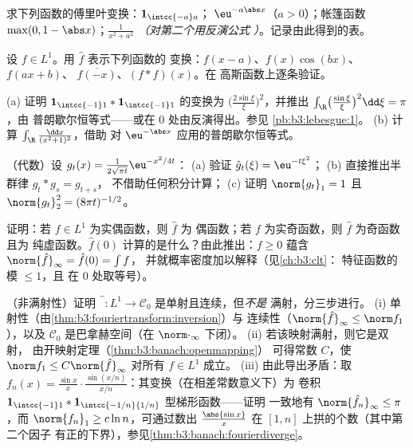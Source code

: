 \begin{exercise}[$\star$]\label{exo:b3:fouriertransform:1}
求下列函数的傅里叶变换：$\mathbf 1_{\intcc{-a}a}$；
$\eu^{-a\abs x}$（$a > 0$）；帐篷函数 $\max(0, 1 -
\abs x)$；$\frac1{x^2 + a^2}$ \emph{（对第二个用反演公式
）}。记录由此得到的表。
\end{exercise}

\begin{exercise}[$\star$]\label{exo:b3:fouriertransform:2}
设 $f \in L^1$。用 $\hat f$ 表示下列函数的
变换：$f(x - a)$、$f(x)\cos(bx)$、$f(ax + b)$、
$\overline{f(-x)}$、$(f * f)(x)$。在
高斯函数上逐条验证。
\end{exercise}

\begin{exercise}[$\star\star$]\label{exo:b3:fouriertransform:3}
(a) 证明 $\mathbf 1_{\intcc{-1}1} * \mathbf
1_{\intcc{-1}1}$ 的变换为 $\bigl(\frac{2\sin\xi}\xi
\bigr)^2$，并推出
$\int_\R\bigl(\frac{\sin\xi}\xi\bigr)^2\dd\xi = \pi$，由
普朗歇尔恒等式——或在 $0$ 处由反演得出。参见
\cref{pb:b3:lebesgue:1}。
(b) 计算 $\int_\R\frac{\dd x}{(x^2+1)^2}$，借助
对 $\eu^{-\abs x}$ 应用的普朗歇尔恒等式。
\end{exercise}

\begin{exercise}[$\star\star$]\label{exo:b3:fouriertransform:4}
（代数）设 $g_t(x) =
\frac1{2\sqrt{\pi t}}\eu^{-x^2/4t}$：
(a) 验证 $\hat g_t(\xi) = \eu^{-t\xi^2}$；
(b) 直接推出半群律 $g_t * g_s = g_{t+s}$，
不借助任何积分计算；
(c) 证明 $\norm{g_t}_1 = 1$ 且 $\norm{g_t}_2^2 =
(8\pi t)^{-1/2}$。
\end{exercise}

\begin{exercise}[$\star\star$]\label{exo:b3:fouriertransform:5}
证明：若 $f \in L^1$ 为实偶函数，则 $\hat f$ 为
偶函数；若 $f$ 为实奇函数，则 $\hat f$ 为奇函数且为
纯虚函数。$\hat f(0)$ 计算的是什么？由此推出：$f \geq
0$ 蕴含 $\norm{\hat f}_\infty = \hat f(0) = \int f$，
并就概率密度加以解释（见\cref{ch:b3:clt}：
特征函数的模 $\leq 1$，且
在 $0$ 处取等号）。
\end{exercise}

\begin{exercise}[$\star\star\star$]\label{exo:b3:fouriertransform:6}
（非满射性）证明 $\widehat{\phantom f}\colon L^1
\to \mathcal C_0$ 是单射且连续，但\emph{不是}
满射，分三步进行。
(i) 单射性（由\cref{thm:b3:fouriertransform:inversion}）与
连续性（$\norm{\hat f}_\infty \leq \norm f_1$），以及
$\mathcal C_0$ 是巴拿赫空间（在
$\norm\cdot_\infty$ 下闭）。
(ii) 若该映射满射，则它是双射，
由开映射定理（\cref{thm:b3:banach:openmapping}）
可得常数 $C$，使 $\norm f_1 \leq C\norm{\hat
f}_\infty$ 对所有 $f \in L^1$ 成立。
(iii) 由此导出矛盾：取 $f_n(x) = \frac{\sin
x}{x}\cdot\frac{\sin(x/n)}{x/n}$：其变换（在相差常数意义下）为
卷积 $\mathbf 1_{\intcc{-1}1} *
\mathbf 1_{\intcc{-1/n}{1/n}}$ 型梯形函数——证明
一致地有 $\norm{\hat f_n}_\infty \leq \pi$，而
$\norm{f_n}_1 \geq c\ln n$，可通过数出
$\frac{\abs{\sin x}}x$ 在 $[1, n]$ 上拱的个数（其中第二个因子
有正的下界），参见\cref{thm:b3:banach:fourierdiverge}。
\end{exercise}

